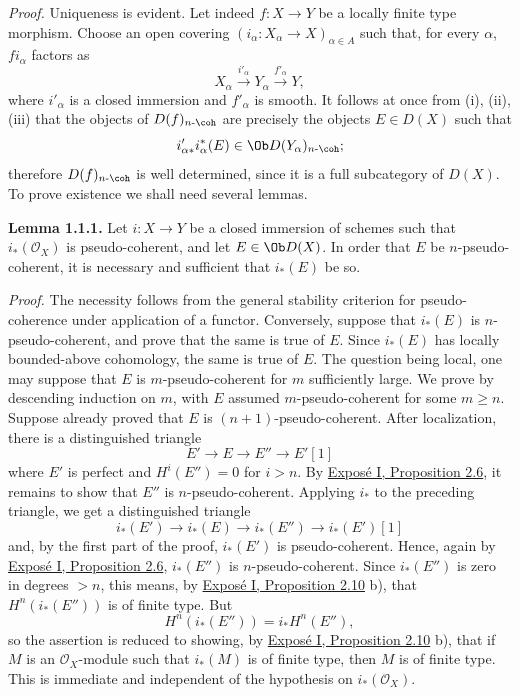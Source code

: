 \emph{Proof.} Uniqueness is evident. Let indeed \(f:X\to Y\) be a locally finite type morphism. Choose an open covering \((i_\alpha:X_\alpha\to X)_{\alpha\in A}\) such that, for every \(\alpha\), \(fi_\alpha\) factors as
\[
  X_\alpha \xrightarrow{i'_\alpha} Y_\alpha \xrightarrow{f'_\alpha} Y,
\]
where \(i'_\alpha\) is a closed immersion and \(f'_\alpha\) is smooth. It follows at once from (i), (ii), (iii) that the objects of \(D(f)_{n\text{-}\coh}\) are precisely the objects \(E\in D(X)\) such that
\[
  i'_{\alpha *}i_\alpha^*(E)\in \Ob D(Y_\alpha)_{n\text{-}\coh};
\]
therefore \(D(f)_{n\text{-}\coh}\) is well determined, since it is a full subcategory of \(D(X)\). To prove existence we shall need several lemmas.

\textbf{Lemma 1.1.1.} Let \(i:X\to Y\) be a closed immersion of schemes such that \(i_*(\mathcal O_X)\) is pseudo-coherent, and let \(E\in \Ob D(X)\). In order that \(E\) be \(n\)-pseudo-coherent, it is necessary and sufficient that \(i_*(E)\) be so.

\emph{Proof.} The necessity follows from the general stability criterion for pseudo-coherence under application of a functor. Conversely, suppose that \(i_*(E)\) is \(n\)-pseudo-coherent, and prove that the same is true of \(E\). Since \(i_*(E)\) has locally bounded-above cohomology, the same is true of \(E\). The question being local, one may suppose that \(E\) is \(m\)-pseudo-coherent for \(m\) sufficiently large. We prove by descending induction on \(m\), with \(E\) assumed \(m\)-pseudo-coherent for some \(m\geq n\). Suppose already proved that \(E\) is \((n+1)\)-pseudo-coherent. After localization, there is a distinguished triangle
\[
E'\longrightarrow E\longrightarrow E''\longrightarrow E'[1]
\]
where \(E'\) is perfect and \(H^i(E'')=0\) for \(i>n\). By \hyperlink{sga6.e01.schol.2-6}{Exposé I, Proposition 2.6}, it remains to show that \(E''\) is \(n\)-pseudo-coherent. Applying \(i_*\) to the preceding triangle, we get a distinguished triangle
\[
i_*(E')\longrightarrow i_*(E)\longrightarrow i_*(E'')\longrightarrow i_*(E')[1]
\]
and, by the first part of the proof, \(i_*(E')\) is pseudo-coherent. Hence, again by \hyperlink{sga6.e01.schol.2-6}{Exposé I, Proposition 2.6}, \(i_*(E'')\) is \(n\)-pseudo-coherent. Since \(i_*(E'')\) is zero in degrees \(>n\), this means, by \hyperlink{sga6.e01.prop.2-10}{Exposé I, Proposition 2.10} b), that \(H^n(i_*(E''))\) is of finite type. But
\[
  H^n(i_*(E''))=i_*H^n(E''),
\]
so the assertion is reduced to showing, by \hyperlink{sga6.e01.prop.2-10}{Exposé I, Proposition 2.10} b), that if \(M\) is an \(\mathcal O_X\)-module such that \(i_*(M)\) is of finite type, then \(M\) is of finite type. This is immediate and independent of the hypothesis on \(i_*(\mathcal O_X)\).

